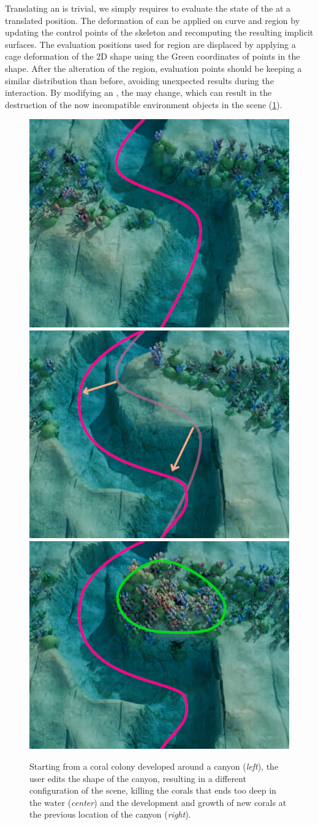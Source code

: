 Translating an  is trivial, we simply requires to evaluate the state of the  at a translated position. The deformation of  can be applied on curve and region  by updating the control points of the skeleton and recomputing the resulting implicit surfaces. The evaluation positions used for region  are displaced by applying a cage deformation of the 2D shape using the Green coordinates of points in the shape. After the alteration of the region, evaluation points should be keeping a similar distribution than before, avoiding unexpected results during the interaction.
By modifying an , the  may change, which can result in the destruction of the now incompatible environment objects in the scene (\cref{fig:semantic-representation_user-interaction}).

\begin{figure}
    \includegraphics[width = 0.3 \linewidth]{Figures/Interactions/InteractionEdition1.png}
    \includegraphics[width = 0.3 \linewidth]{Figures/Interactions/InteractionEdition2.png}
    \includegraphics[width = 0.3 \linewidth]{Figures/Interactions/InteractionEdition3.png}
    \caption{Starting from a coral colony developed around a canyon (\textit{left}), the user edits the shape of the canyon, resulting in a different configuration of the scene, killing the corals that ends too deep in the water (\textit{center}) and the development and growth of new corals at the previous location of the canyon (\textit{right}). }
    \label{fig:semantic-representation_user-interaction}
\end{figure}

